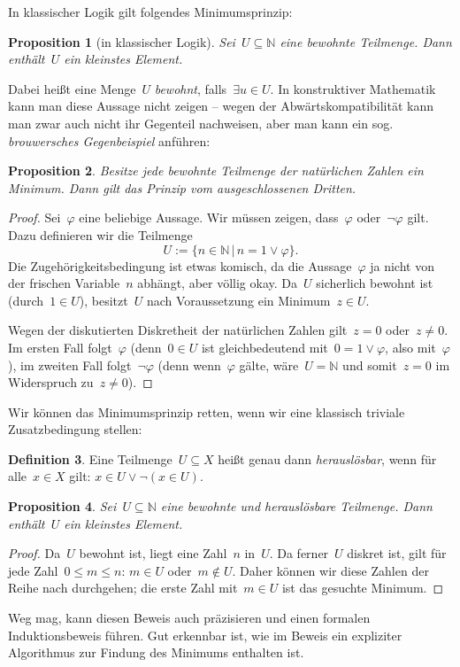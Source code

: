 \documentclass[a4paper,ngerman,12pt]{scrartcl}
\theoremstyle{definition}
\newtheorem{defn}{Definition}[section]
\theoremstyle{plain}
\newtheorem{prop}[defn]{Proposition}
\theoremstyle{remark}
\newcommand{\NN}{\mathbb{N}}
\renewcommand{\_}{\mathpunct{.}\,}
\newcommand{\?}{\,{:}\,}
\begin{document}
In klassischer Logik gilt folgendes Minimumsprinzip:
\begin{prop}[in klassischer Logik]Sei~$U \subseteq \NN$ eine bewohnte
Teilmenge. Dann enthält~$U$ ein kleinstes Element.\end{prop}
Dabei heißt eine Menge~$U$ \emph{bewohnt}, falls~$\exists u \in U$.
In konstruktiver Mathematik kann man diese Aussage nicht zeigen -- wegen der
Ab\-wärts\-kom\-pa\-ti\-bi\-li\-tät kann man zwar auch nicht ihr Gegenteil
nachweisen, aber man kann ein sog. \emph{brouwersches Gegenbeispiel}
anführen:
\begin{prop}Besitze jede bewohnte Teilmenge der natürlichen Zahlen ein Minimum.
Dann gilt das Prinzip vom ausgeschlossenen Dritten.\end{prop}
\begin{proof}Sei~$\varphi$ eine beliebige Aussage. Wir müssen zeigen,
dass~$\varphi$ oder~$\neg\varphi$ gilt. Dazu definieren wir die Teilmenge
\[ U := \{ n \in \NN \,|\, n = 1 \vee \varphi \}. \]
Die Zugehörigkeitsbedingung ist etwas komisch, da die Aussage~$\varphi$ ja
nicht von der frischen Variable~$n$ abhängt, aber völlig okay. Da~$U$
sicherlich bewohnt ist (durch~$1 \in U$), besitzt~$U$ nach Voraussetzung ein
Minimum~$z \in U$.

Wegen der diskutierten Diskretheit der natürlichen Zahlen gilt~$z = 0$ oder~$z
\neq 0$. Im ersten Fall folgt~$\varphi$ (denn~$0 \in U$ ist gleichbedeutend
mit~$0 = 1 \vee \varphi$, also mit~$\varphi$), im zweiten Fall folgt~$\neg\varphi$ (denn
wenn~$\varphi$ gälte, wäre~$U = \NN$ und somit~$z = 0$ im Widerspruch zu~$z
\neq 0$).\end{proof}

Wir können das Minimumsprinzip retten, wenn wir eine klassisch triviale
Zusatzbedingung stellen:
\begin{defn}Eine Teilmenge~$U \subseteq X$ heißt genau dann
\emph{herauslösbar}, wenn für alle~$x \in X$ gilt: $x \in U \vee \neg(x \in
U)$.\end{defn}
\begin{prop}Sei~$U \subseteq \NN$ eine bewohnte und herauslösbare Teilmenge.
Dann enthält~$U$ ein kleinstes Element.\end{prop}
\begin{proof}Da~$U$ bewohnt ist, liegt eine Zahl~$n$ in~$U$. Da ferner~$U$
diskret ist, gilt für jede Zahl~$0 \leq m \leq n$: $m \in U$ oder~$m \not\in
U$. Daher können wir diese Zahlen der Reihe nach durchgehen; die erste Zahl
mit~$m \in U$ ist das gesuchte Minimum.
\end{proof}
Weg mag, kann diesen Beweis auch präzisieren und einen formalen
Induktionsbeweis führen. Gut erkennbar ist, wie im Beweis ein expliziter
Algorithmus zur Findung des Minimums enthalten ist.
\end{document}
